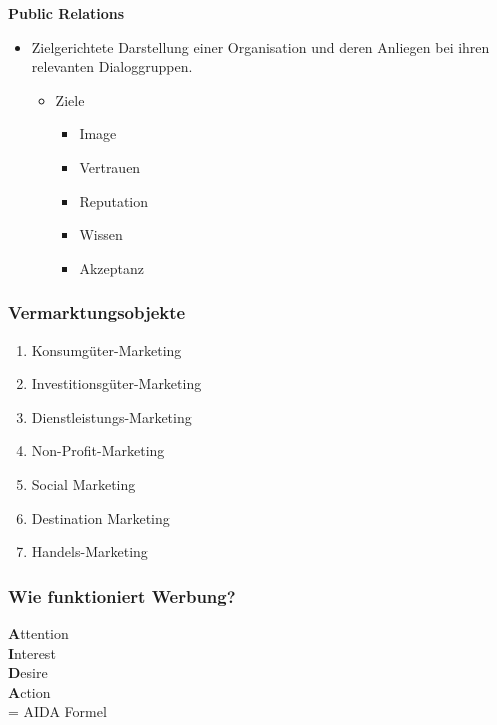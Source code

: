\documentclass[../ZF_Wing.tex]{subfiles}
\begin{document}
\textbf{Public Relations\\}
\begin{itemize}
	\item Zielgerichtete Darstellung einer Organisation und deren Anliegen bei ihren relevanten Dialoggruppen.
	\begin{itemize}
		\item Ziele
		\begin{itemize}
			\item Image
			\item Vertrauen
			\item Reputation
			\item Wissen
			\item Akzeptanz
		\end{itemize}
	\end{itemize}
\end{itemize}


\subsubsection{Vermarktungsobjekte}

\begin{enumerate}
	\item Konsumgüter-Marketing
	\item Investitionsgüter-Marketing
	\item Dienstleistungs-Marketing
	\item Non-Profit-Marketing
	\item Social Marketing
	\item Destination Marketing
	\item Handels-Marketing
\end{enumerate}


\subsubsection{Wie funktioniert Werbung?}

\textbf Attention \\
\textbf Interest \\
\textbf Desire \\
\textbf Action \\

= AIDA Formel
\end{document}
